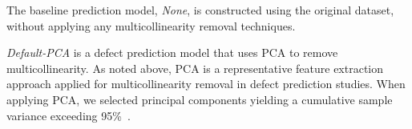 The baseline prediction model, \emph{None}, is constructed using the original dataset, without applying any multicollinearity removal techniques.

\emph{Default-PCA} is a defect prediction model that uses PCA to remove multicollinearity. As noted above, PCA is a representative feature extraction approach applied for multicollinearity removal in defect prediction studies. 
When applying PCA, we selected principal components yielding a cumulative sample variance exceeding 95\%~\cite{Zimmermann2008ICSEnetwork, Pinzger2008FSEnetwork}. 

